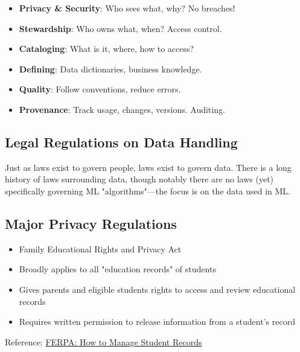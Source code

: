 \documentclass[12pt]{article}
\begin{document}
\begin{tcolorbox}[colback=green!5!white,colframe=green!75!black,title={Six Pillars of Data Governance}]
\begin{itemize}
    \item \textbf{Privacy \& Security}: Who sees what, why? No breaches!
    \item \textbf{Stewardship}: Who owns what, when? Access control.
    \item \textbf{Cataloging}: What is it, where, how to access?
    \item \textbf{Defining}: Data dictionaries, business knowledge.
    \item \textbf{Quality}: Follow conventions, reduce errors.
    \item \textbf{Provenance}: Track usage, changes, versions. Auditing.
\end{itemize}
\end{tcolorbox}

\subsection{Legal Regulations on Data Handling}

\begin{tcolorbox}[colback=yellow!5!white,colframe=yellow!75!black,title={Key Insight}]
Just as laws exist to govern people, laws exist to govern data. There is a long history of laws surrounding data, though notably there are no laws (yet) specifically governing ML "algorithms"—the focus is on the data used in ML.
\end{tcolorbox}

\subsection{Major Privacy Regulations}

\begin{tcolorbox}[colback=blue!5!white,colframe=blue!75!black,title={FERPA 1974}]
\begin{itemize}
    \item Family Educational Rights and Privacy Act
    \item Broadly applies to all "education records" of students
    \item Gives parents and eligible students rights to access and review educational records
    \item Requires written permission to release information from a student's record
\end{itemize}
Reference: \href{https://www.recordnations.com/2019/07/ferpa-how-to-manage-student-records}{FERPA: How to Manage Student Records}
\end{tcolorbox}
\end{document}
